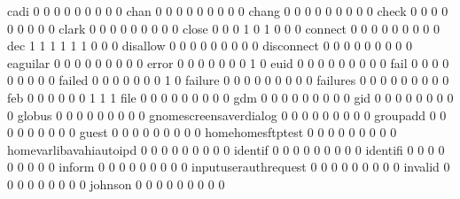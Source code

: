 \documentclass[compress,8pt]{beamer}
\begin{document}
\begin{frame}
\begin{Schunk}
  cadi                                       0   0   0   0   0   0   0   0   0
  chan                                       0   0   0   0   0   0   0   0   0
  chang                                      0   0   0   0   0   0   0   0   0
  check                                      0   0   0   0   0   0   0   0   0
  clark                                      0   0   0   0   0   0   0   0   0
  close                                      0   0   0   1   0   1   0   0   0
  connect                                    0   0   0   0   0   0   0   0   0
  dec                                        1   1   1   1   1   1   0   0   0
  disallow                                   0   0   0   0   0   0   0   0   0
  disconnect                                 0   0   0   0   0   0   0   0   0
  eaguilar                                   0   0   0   0   0   0   0   0   0
  error                                      0   0   0   0   0   0   0   1   0
  euid                                       0   0   0   0   0   0   0   0   0
  fail                                       0   0   0   0   0   0   0   0   0
  failed                                     0   0   0   0   0   0   0   1   0
  failure                                    0   0   0   0   0   0   0   0   0
  failures                                   0   0   0   0   0   0   0   0   0
  feb                                        0   0   0   0   0   0   1   1   1
  file                                       0   0   0   0   0   0   0   0   0
  gdm                                        0   0   0   0   0   0   0   0   0
  gid                                        0   0   0   0   0   0   0   0   0
  globus                                     0   0   0   0   0   0   0   0   0
  gnomescreensaverdialog                     0   0   0   0   0   0   0   0   0
  groupadd                                   0   0   0   0   0   0   0   0   0
  guest                                      0   0   0   0   0   0   0   0   0
  homehomesftptest                           0   0   0   0   0   0   0   0   0
  homevarlibavahiautoipd                     0   0   0   0   0   0   0   0   0
  identif                                    0   0   0   0   0   0   0   0   0
  identifi                                   0   0   0   0   0   0   0   0   0
  inform                                     0   0   0   0   0   0   0   0   0
  inputuserauthrequest                       0   0   0   0   0   0   0   0   0
  invalid                                    0   0   0   0   0   0   0   0   0
  johnson                                    0   0   0   0   0   0   0   0   0

\end{Schunk}
\end{frame}
\end{document}
